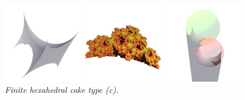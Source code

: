 \documentclass[suppldata, dvipdfmx]{interact}
\theoremstyle{plain}%
\theoremstyle{definition}
\theoremstyle{remark}
\theoremstyle{problemstyle}
\begin{document}
\begin{figure}[H]
 \begin{minipage}{0.5\textwidth}
  \begin{minipage}[t]{0.24\textwidth}
   \centering \includegraphics[width=1.35in, height=1.35in,
   keepaspectratio]{./img/sphairahedron/hexahedralCake2/sphairahedronFinite_c.png}
  \end{minipage}
  \hspace*{\fill}
  \begin{minipage}[t]{0.24\textwidth}
   \centering
   \includegraphics[width=1.35in, height=1.35in,
   keepaspectratio]{./img/sphairahedron/hexahedralCake2/limitsetFinite_c.png}
  \end{minipage}
  \hspace*{\fill}
  \caption{\textit{Finite hexahedral cake type (c).}}
  \label{}
 \end{minipage}
 \hspace*{\fill}
 \begin{minipage}{0.5\textwidth}
  \begin{minipage}[t]{0.24\textwidth}
   \centering
   \includegraphics[width=1.35in, height=1.35in,
   keepaspectratio]{./img/sphairahedron/hexahedralCake2/sphairahedronInf_c.png}
  \end{minipage}
  \hspace*{\fill}

\end{minipage}
\end{figure}
\end{document}
